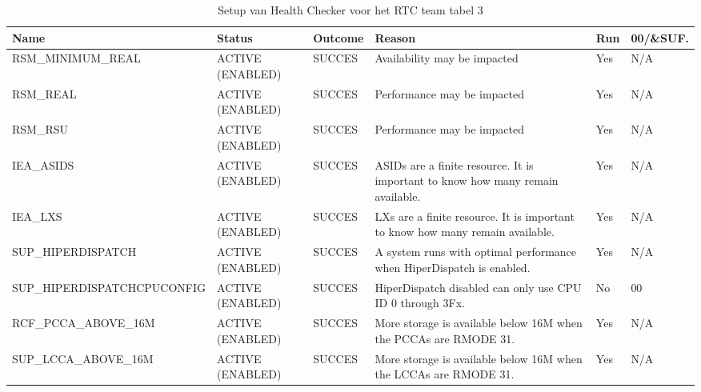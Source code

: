 \begin{landscape}
	\begin{table}[h]
		\begin{tabular}{|l|p{2.3cm}|l|p{4.5cm}|l|l|}
			\hline
			\textbf{Name}                       & \textbf{Status}   & \textbf{Outcome} & \textbf{Reason}    & \textbf{Run} &	\textbf{00/\&SUF.} \\ \hline
			RSM\_MINIMUM\_REAL          & ACTIVE (ENABLED) & SUCCES & Availability   may be impacted                                                    & Yes & N/A \\ \hline
			RSM\_REAL                   & ACTIVE (ENABLED) & SUCCES & Performance   may be impacted                                                     & Yes & N/A \\ \hline
			RSM\_RSU                    & ACTIVE (ENABLED) & SUCCES & Performance   may be impacted                                                     & Yes & N/A \\ \hline
			IEA\_ASIDS                  & ACTIVE (ENABLED) & SUCCES & ASIDs   are a finite resource. It is important to know how many remain available. & Yes & N/A \\ \hline
			IEA\_LXS                    & ACTIVE (ENABLED) & SUCCES & LXs are   a finite resource. It is important to know how many remain available.   & Yes & N/A \\ \hline
			SUP\_HIPERDISPATCH          & ACTIVE (ENABLED) & SUCCES & A   system runs with optimal performance when HiperDispatch is enabled.           & Yes & N/A \\ \hline
			SUP\_HIPERDISPATCHCPUCONFIG & ACTIVE (ENABLED) & SUCCES & HiperDispatch disabled can only use CPU ID 0 through 3Fx.                         & No  & 00  \\ \hline
			RCF\_PCCA\_ABOVE\_16M       & ACTIVE (ENABLED) & SUCCES & More   storage is available below 16M when the PCCAs are RMODE 31.                & Yes & N/A \\ \hline
			SUP\_LCCA\_ABOVE\_16M       & ACTIVE (ENABLED) & SUCCES & More   storage is available below 16M when the LCCAs are RMODE 31.                & Yes & N/A \\ \hline
		\end{tabular}
		\caption[Health Checker RTC team tabel 3]{Setup van Health Checker voor het RTC team tabel 3}
		\label{tbl:RTC Team Tabel 3}
	\end{table}
\end{landscape}


